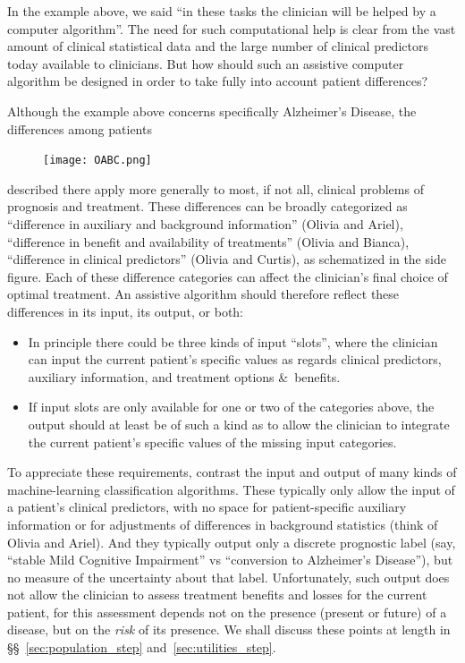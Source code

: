 \documentclass[utf8]{FrontiersinHarvard} %
\newcommand*{\pencil}{{\fontencoding{U}\fontfamily{fontawesometwo}\selectfont\symbol{210}}}
\newcommand{\mynotep}[1]{{\color{notecolour}\pencil\ #1}}
\newcommand*{\amp}{\&}
\newcommand*{\sects}{\S\S}%
\renewcommand*{\|}[1][]{\nonscript\:#1\vert\nonscript\:\mathopen{}}
\newcommand*{\ad}{Alzheimer's Disease}
\newcommand*{\mci}{Mild Cognitive Impairment}
\begin{document}
In the example above, we said \enquote{in these tasks the clinician will be helped by a computer algorithm}. The need for such computational help is clear from the vast amount of clinical statistical data and the large number of clinical predictors today available to clinicians. But how should such an assistive computer algorithm be designed in order to take fully into account patient differences?

Although the example above concerns specifically \ad, the differences among patients
\begin{figure}%
\vspace{-1.5em}%
\texttt{[image: OABC.png]}%
\vspace{-2em}%
\end{figure}
described there apply more generally to most, if not all, clinical problems of prognosis and treatment. These differences can be broadly categorized as \enquote{difference in auxiliary and background information} (Olivia and Ariel), \enquote{difference in benefit and availability of treatments} (Olivia and Bianca), \enquote{difference in clinical predictors} (Olivia and Curtis), as schematized in the side figure. Each of these difference categories can affect the clinician's final choice of optimal treatment. An assistive algorithm should therefore reflect these differences in its input, its output, or both:
\begin{itemize}
\item In principle there could be three kinds of input \enquote{slots}, where the clinician can input the current patient's specific values as regards clinical predictors, auxiliary information, and treatment options \amp\ benefits.
\item If input slots are only available for one or two of the categories above, the output should at least be of such a kind as to allow the clinician to integrate the current patient's specific values of the missing input categories.
\end{itemize}

To appreciate these requirements, contrast the input and output of many kinds of machine-learning classification algorithms. These typically only allow the input of a patient's clinical predictors, with no space for patient-specific auxiliary information or for adjustments of differences in background statistics (think of Olivia and Ariel). And they typically output only a discrete prognostic label (say, \enquote{stable \mci} vs \enquote{conversion to \ad}), but no measure of the uncertainty about that label. Unfortunately, such output does not allow the clinician to assess treatment benefits and losses for the current patient, for this assessment depends not on the presence (present or future) of a disease, but on the \emph{risk} of its presence. We shall discuss these points at length in \sects~\ref{sec:population_step} and~\ref{sec:utilities_step}.
\end{document}
